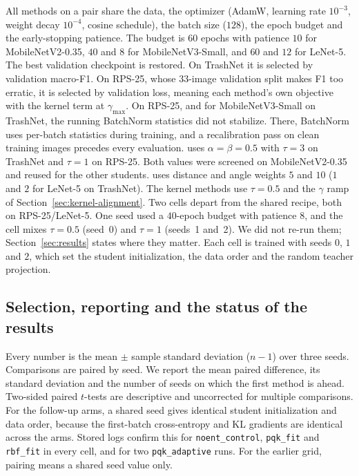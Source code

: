 All methods on a pair share the data, the optimizer (AdamW, learning rate $10^{-3}$, weight decay $10^{-4}$, cosine schedule), the batch size ($128$), the epoch budget and the early-stopping patience.
The budget is $60$ epochs with patience $10$ for MobileNetV2-0.35, $40$ and $8$ for MobileNetV3-Small, and $60$ and $12$ for LeNet-5.
The best validation checkpoint is restored. On TrashNet it is selected by validation macro-F1. On RPS-25, whose $33$-image validation split makes F1 too erratic, it is selected by validation loss, meaning each method's own objective with the kernel term at $\gamma_{\max}$.
On RPS-25, and for MobileNetV3-Small on TrashNet, the running BatchNorm statistics did not stabilize. There, BatchNorm uses per-batch statistics during training, and a recalibration pass on clean training images precedes every evaluation.
\Kd uses $\alpha=\beta=0.5$ with $\tau=3$ on TrashNet and $\tau=1$ on RPS-25. Both values were screened on MobileNetV2-0.35 and reused for the other students.
\Rkd uses distance and angle weights $5$ and $10$ ($1$ and $2$ for LeNet-5 on TrashNet). The kernel methods use $\tau=0.5$ and the $\gamma$ ramp of Section~\ref{sec:kernel-alignment}.
Two cells depart from the shared recipe, both on RPS-25/LeNet-5. One \Scratch seed used a $40$-epoch budget with patience $8$, and the \Kd cell mixes $\tau=0.5$ (seed~0) and $\tau=1$ (seeds~1 and~2). We did not re-run them; Section~\ref{sec:results} states where they matter.
Each cell is trained with seeds $0$, $1$ and $2$, which set the student initialization, the data order and the random teacher projection.

\subsection{Selection, reporting and the status of the results}
\label{sec:setup-protocol}

Every number is the mean $\pm$ sample standard deviation ($n{-}1$) over three seeds.
Comparisons are paired by seed. We report the mean paired difference, its standard deviation and the number of seeds on which the first method is ahead. Two-sided paired $t$-tests are descriptive and uncorrected for multiple comparisons.
For the follow-up arms, a shared seed gives identical student initialization and data order, because the first-batch cross-entropy and KL gradients are identical across the arms. Stored logs confirm this for \texttt{noent\_control}, \texttt{pqk\_fit} and \texttt{rbf\_fit} in every cell, and for two \texttt{pqk\_adaptive} runs. For the earlier grid, pairing means a shared seed value only.

